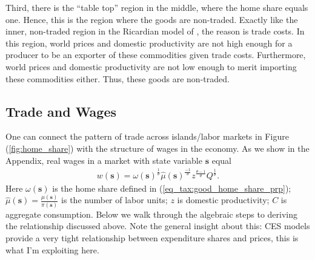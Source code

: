 \documentclass[pdftex,12pt]{article}
\begin{document}
\medskip
\noindent Third, there is the ``table top'' region in the middle, where the home share equals one. Hence, this is the region where the goods are non-traded. Exactly like the inner, non-traded region in the Ricardian model of \citet{dornbusch1977comparative}, the reason is trade costs. In this region, world prices and domestic productivity are not high enough for a producer to be an exporter of these commodities given trade costs. Furthermore, world prices and domestic productivity are not low enough to merit importing these commodities either. Thus, these goods are non-traded.

\subsection{Trade and Wages}

One can connect the pattern of trade across islands/labor markets in Figure (\ref{fig:home_share}) with the structure of wages in the economy. As we show in the Appendix, real wages in a market with state variable $\textbf{s}$ equal
\begin{align}
 w(\textbf{s}) = \omega(\textbf{s})^{\frac{1}{\theta}} \hat \mu( \textbf{s})^{\frac{-1}{\theta}}z^{\frac{\theta-1}{\theta}} Q^{\frac{1}{\theta}}.
 \label{eq_tax:wage_home_share_prp}
\end{align}
Here $\omega(\textbf{s})$ is the home share defined in (\ref{eq_tax:good_home_share_prp}); $\hat \mu( \textbf{s}) = \frac{\mu(\textbf{s})}{\pi(\textbf{s})}$ is the number of labor units;  $z$ is domestic productivity; $C$ is aggregate consumption. Below we walk through the algebraic steps to deriving the relationship discussed above. Note the general insight about this: CES models provide a very tight relationship between expenditure shares and prices, this is what I'm exploiting here.
\end{document}
